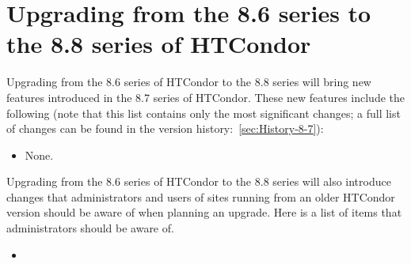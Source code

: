 \section{\label{sec:to-8.8}Upgrading from the 8.6 series to the 8.8 series of HTCondor}

Upgrading from the 8.6 series of HTCondor to the 8.8 series
will bring new features introduced in the 8.7 series of HTCondor.
These new features include the following (note that this list contains
only the most significant changes; a full list of changes can be
found in the version history:~\ref{sec:History-8-7}):

\begin{itemize}

\item None.

\end{itemize}

Upgrading from the 8.6 series of HTCondor to the 8.8 series will
also introduce changes that administrators and users of sites running
from an older HTCondor version should be aware of when planning an upgrade.
Here is a list of items that administrators should be aware of.

\begin{itemize}

\item

\end{itemize}

